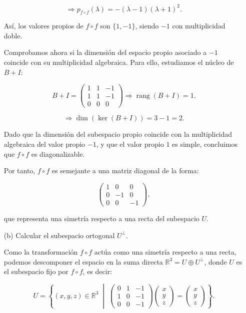 \documentclass[12pt]{article}
\begin{document}
\begin{ejercicio}[4 puntos]
\begin{enumerate}
					\[
					\Rightarrow p_{f \circ f}(\lambda) = -(\lambda - 1)(\lambda + 1)^2.
					\]
					
					Así, los valores propios de \( f \circ f \) son \( \{1, -1\} \), siendo \( -1 \) con multiplicidad doble.
					
					\medskip
					
					Comprobamos ahora si la dimensión del espacio propio asociado a \( -1 \) coincide con su multiplicidad algebraica. Para ello, estudiamos el núcleo de \( B + I \):
					
					\[
					B + I = 
					\begin{pmatrix}
						1 & 1 & -1 \\
						1 & 1 & -1 \\
						0 & 0 & 0
					\end{pmatrix} \Rightarrow \operatorname{rang}(B + I) = 1.
					\]
					
					\[
					\Rightarrow \dim(\ker(B + I)) = 3 - 1 = 2.
					\]
					
					\medskip
					
					Dado que la dimensión del subespacio propio coincide con la multiplicidad algebraica del valor propio \( -1 \), y que el valor propio \( 1 \) es simple, concluimos que \( f \circ f \) es diagonalizable.
					
					\medskip
					
					Por tanto, \( f \circ f \) es semejante a una matriz diagonal de la forma:
					
					\[
					\begin{pmatrix}
						1 & 0 & 0 \\
						0 & -1 & 0 \\
						0 & 0 & -1
					\end{pmatrix},
					\]
					
					que representa una simetría respecto a una recta del subespacio $U$.
				
			\item[(b)] Calcular el subespacio ortogonal $U^\perp$.
			
			Como la transformación \( f \circ f \) actúa como una simetría respecto a una recta, podemos descomponer el espacio en la suma directa \( \mathbb{R}^3 = U \oplus U^\perp \), donde \( U \) es el subespacio fijo por \( f \circ f \), es decir:
			
			\[
			U = \left\{ 
			(x, y, z) \in \mathbb{R}^3 \;\middle|\; 
			\begin{pmatrix}
				0 & 1 & -1 \\
				1 & 0 & -1 \\
				0 & 0 & -1
			\end{pmatrix}
			\begin{pmatrix}
				x \\ y \\ z
			\end{pmatrix}
			=
			\begin{pmatrix}
				x \\ y \\ z
			\end{pmatrix}
			\right\}.
			\]
			

\end{enumerate}
\end{ejercicio}
\end{document}
